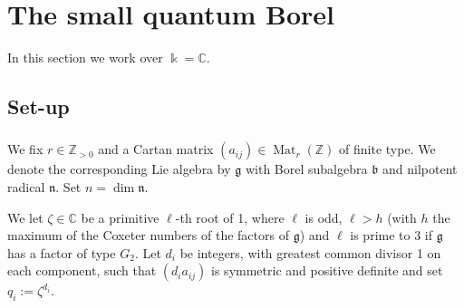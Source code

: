 \documentclass{amsart}
\numberwithin{equation}{section}
\theoremstyle{definition}
\theoremstyle{remark}
\newcommand{\bk}{\Bbbk}
\newcommand{\mZ}{\mathbb{Z}}
\newcommand{\fg}{\mathfrak{g}}
\newcommand{\fb}{\mathfrak{b}}
\newcommand{\fn}{\mathfrak{n}}
\newcommand{\mC}{\mathbb{C}}
\newcommand{\Mat}{\operatorname{Mat}}
\begin{document}




\section{The small quantum Borel}\label{sec:Borel}

In this section we work over $\bk=\mC$.


\subsection{Set-up}
\subsubsection{}\label{sec:data}
We fix $r\in\mZ_{>0}$ and a Cartan matrix $(a_{ij})\in \Mat_r(\mZ)$ of finite type. We denote the corresponding Lie algebra by $\fg$ with Borel subalgebra $\fb$ and nilpotent radical $\fn$. Set $n=\dim \fn$. 


We let $\zeta\in\mC$ be a primitive $\ell$-th root of 1, where $\ell$ is odd, $\ell>h$ (with $h$ the maximum of the Coxeter numbers of the factors of $\fg$) and $\ell$ is prime to $3$ if $\fg$ has a factor of type $G_2$. Let $d_i$ be integers, with greatest common divisor 1 on each component, such that $(d_ia_{ij})$ is symmetric and positive definite and set $q_i:=\zeta^{d_i}$. 
\end{document}
